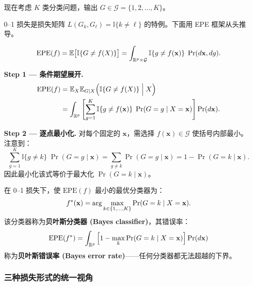 现在考虑 $K$ 类分类问题，输出 $G \in \mathcal{G} = \{1, 2, \dots, K\}$。


0--1 损失是损失矩阵 $L(G_k, G_\ell) = \mathbb{I}\{k \neq \ell\}$ 的特例。下面用 EPE 框架从头推导。

\begin{definition}
\begin{equation}\label{eq:epe_01}
    \mathrm{EPE}(f)
    = \mathbb{E}\big[ \mathbb{I}\{G \neq f(X)\} \big]
    = \int_{\mathbb{R}^p \times \mathcal{G}} \mathbb{I}\{g \neq f(\mathbf{x})\} \; \Pr(d\mathbf{x}, dg).
\end{equation}
\end{definition}

\textbf{Step 1 --- 条件期望展开.}
\begin{align}
    \mathrm{EPE}(f)
    &= \mathbb{E}_X \mathbb{E}_{G \mid X}\Big( \mathbb{I}\{G \neq f(X)\} \;\Big|\; X \Big) \nonumber \\
    &= \int_{\mathbb{R}^p} \left[ \sum_{g=1}^{K} \mathbb{I}\{g \neq f(\mathbf{x})\} \; \Pr(G = g \mid X = \mathbf{x}) \right] \Pr(d\mathbf{x}). \label{eq:epe01_step1}
\end{align}

\textbf{Step 2 --- 逐点最小化.}
对每个固定的 $\mathbf{x}$，需选择 $f(\mathbf{x}) \in \mathcal{G}$ 使括号内部最小。注意到：
\[
\sum_{g=1}^{K} \mathbb{I}\{g \neq k\} \; \Pr(G = g \mid \mathbf{x})
= \sum_{g \neq k} \Pr(G = g \mid \mathbf{x})
= 1 - \Pr(G = k \mid \mathbf{x}).
\]
因此最小化该式等价于最大化 $\Pr(G = k \mid \mathbf{x})$。

\begin{theorem}[贝叶斯分类器]\label{thm:bayes_classifier}
在 0--1 损失下，使 $\mathrm{EPE}(f)$ 最小的最优分类器为：
\begin{equation}\label{eq:bayes_classifier}
    f^*(\mathbf{x}) = \arg\max_{k \in \{1,\dots,K\}} \Pr(G = k \mid X = \mathbf{x}).
\end{equation}
该分类器称为\textbf{贝叶斯分类器 (Bayes classifier)}，其错误率：
\begin{equation}\label{eq:bayes_error}
    \mathrm{EPE}(f^*) = \int_{\mathbb{R}^p} \Big[1 - \max_{k} \Pr(G = k \mid X = \mathbf{x})\Big] \Pr(d\mathbf{x})
\end{equation}
称为\textbf{贝叶斯错误率 (Bayes error rate)}——任何分类器都无法超越的下界。
\end{theorem}

\subsubsection{三种损失形式的统一视角}

